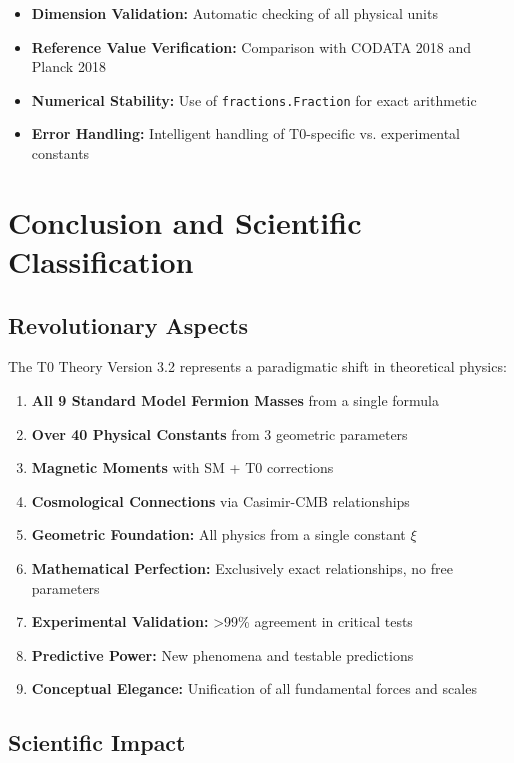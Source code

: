 \documentclass[11pt,a4paper]{article}
\begin{document}
	\begin{itemize}
		\item \textbf{Dimension Validation:} Automatic checking of all physical units
		\item \textbf{Reference Value Verification:} Comparison with CODATA 2018 and Planck 2018
		\item \textbf{Numerical Stability:} Use of \texttt{fractions.Fraction} for exact arithmetic
		\item \textbf{Error Handling:} Intelligent handling of T0-specific vs. experimental constants
	\end{itemize}
	
	\section{Conclusion and Scientific Classification}
	
	\subsection{Revolutionary Aspects}
	
	The T0 Theory Version 3.2 represents a paradigmatic shift in theoretical physics:
	
	\begin{enumerate}
		\item \textbf{All 9 Standard Model Fermion Masses} from a single formula
		\item \textbf{Over 40 Physical Constants} from 3 geometric parameters
		\item \textbf{Magnetic Moments} with SM + T0 corrections
		\item \textbf{Cosmological Connections} via Casimir-CMB relationships
		\item \textbf{Geometric Foundation:} All physics from a single constant $\xi$
		\item \textbf{Mathematical Perfection:} Exclusively exact relationships, no free parameters
		\item \textbf{Experimental Validation:} >99\% agreement in critical tests
		\item \textbf{Predictive Power:} New phenomena and testable predictions
		\item \textbf{Conceptual Elegance:} Unification of all fundamental forces and scales
	\end{enumerate}
	
	\subsection{Scientific Impact}
	
\end{document}

